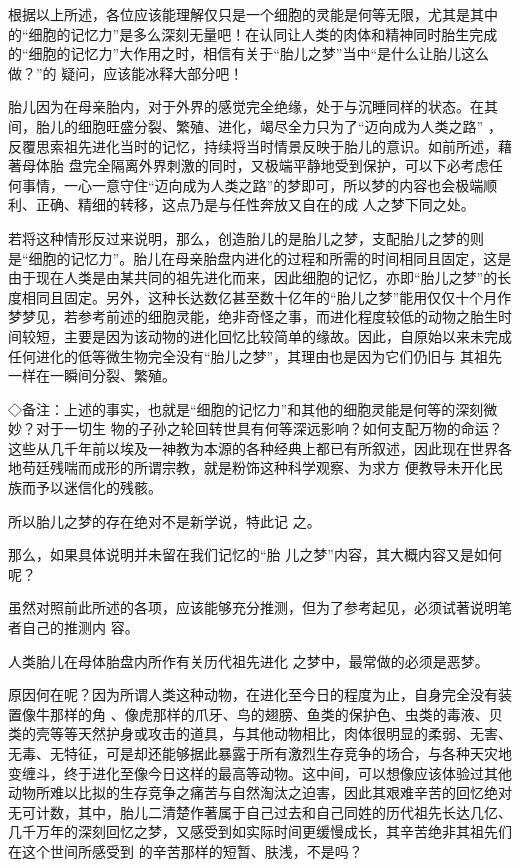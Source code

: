 \documentclass{article}
\begin{document}
根据以上所述，各位应该能理解仅只是一个细胞的灵能是何等无限，尤其是其中的“细胞的记忆力”是多么深刻无量吧！在认同让人类的肉体和精神同时胎生完成的“细胞的记忆力”大作用之时，相信有关于“胎儿之梦”当中“是什么让胎儿这么做？”的
疑问，应该能冰释大部分吧！ 

胎儿因为在母亲胎内，对于外界的感觉完全绝缘，处于与沉睡同样的状态。在其间，胎儿的细胞旺盛分裂、繁殖、进化，竭尽全力只为了“迈向成为人类之路” ，反覆思索祖先进化当时的记忆，持续将当时情景反映于胎儿的意识。如前所述，藉著母体胎
\newpage
盘完全隔离外界刺激的同时，又极端平静地受到保护，可以下必考虑任何事情，一心一意守住“迈向成为人类之路”的梦即可，所以梦的内容也会极端顺利、正确、精细的转移，这点乃是与任性奔放又自在的成
人之梦下同之处。 

若将这种情形反过来说明，那么，创造胎儿的是胎儿之梦，支配胎儿之梦的则是“细胞的记忆力”。胎儿在母亲胎盘内进化的过程和所需的时间相同且固定，这是由于现在人类是由某共同的祖先进化而来，因此细胞的记忆，亦即“胎儿之梦”的长度相同且固定。另外，这种长达数亿甚至数十亿年的“胎儿之梦”能用仅仅十个月作梦梦见，若参考前述的细胞灵能，绝非奇怪之事，而进化程度较低的动物之胎生时间较短，主要是因为该动物的进化回忆比较简单的缘故。因此，自原始以来未完成任何进化的低等微生物完全没有“胎儿之梦”，其理由也是因为它们仍旧与
其祖先一样在一瞬间分裂、繁殖。 

◇备注：上述的事实，也就是“细胞的记忆力”和其他的细胞灵能是何等的深刻微妙？对于一切生
\newpage
物的子孙之轮回转世具有何等深远影响？如何支配万物的命运？这些从几千年前以埃及一神教为本源的各种经典上都已有所叙述，因此现在世界各地苟廷残喘而成形的所谓宗教，就是粉饰这种科学观察、为求方
便教导未开化民族而予以迷信化的残骸。 

所以胎儿之梦的存在绝对不是新学说，特此记
之。 

那么，如果具体说明并未留在我们记忆的“胎
儿之梦”内容，其大概内容又是如何呢？ 

虽然对照前此所述的各项，应该能够充分推测，但为了参考起见，必须试著说明笔者自己的推测内
容。 

人类胎儿在母体胎盘内所作有关历代祖先进化
之梦中，最常做的必须是恶梦。 

原因何在呢？因为所谓人类这种动物，在进化至今日的程度为止，自身完全没有装置像牛那样的角
\newpage
、像虎那样的爪牙、鸟的翅膀、鱼类的保护色、虫类的毒液、贝类的壳等等天然护身或攻击的道具，与其他动物相比，肉体很明显的柔弱、无害、无毒、无特征，可是却还能够据此暴露于所有激烈生存竞争的场合，与各种天灾地变缠斗，终于进化至像今日这样的最高等动物。这中间，可以想像应该体验过其他动物所难以比拟的生存竞争之痛苦与自然淘汰之迫害，因此其艰难辛苦的回忆绝对无可计数，其中，胎儿二清楚作著属于自己过去和自己同姓的历代祖先长达几亿、几千万年的深刻回忆之梦，又感受到如实际时间更缓慢成长，其辛苦绝非其祖先们在这个世间所感受到
的辛苦那样的短暂、肤浅，不是吗？ 
\end{document}
